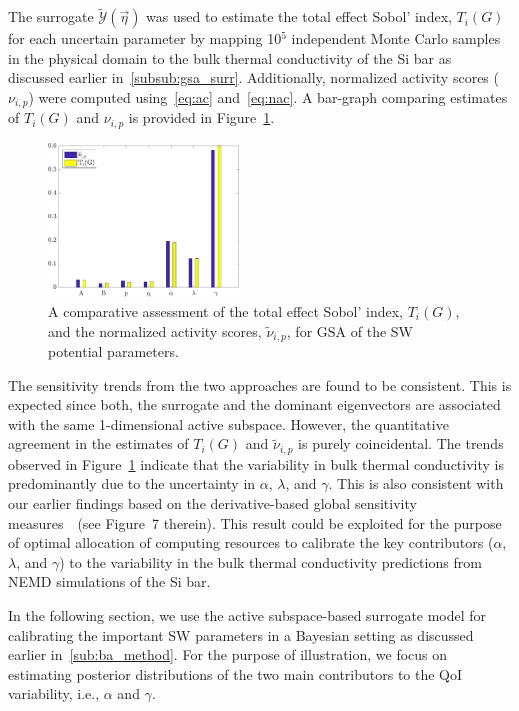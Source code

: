 The surrogate $\tilde{\mathcal{Y}}(\vec{\eta})$ was used to estimate the total effect Sobol'
 index, $T_i(G)$ for each
uncertain parameter by mapping 10$^5$ independent Monte Carlo samples in the physical domain
to the bulk thermal conductivity of the Si bar as discussed earlier in~\ref{subsub:gsa_surr}. 
Additionally, normalized activity scores ($\nu_{i,p}$) were computed using~\eqref{eq:ac} and~\eqref{eq:nac}.
A bar-graph comparing estimates of $T_i(G)$ and $\nu_{i,p}$ is provided in
Figure~\ref{fig:gsa}. 
%
\begin{figure}[htbp]
\begin{center}
\includegraphics[width=0.45\textwidth]{./Figures/free_as_gsa}
\caption{A comparative assessment of the total effect Sobol' index, $T_i(G)$, and the normalized
activity scores, $\tilde{\nu}_{i,p}$, for GSA of the SW potential parameters.}
\label{fig:gsa}
\end{center}
\end{figure}
%
The sensitivity trends from the two approaches are found to be consistent. This is expected since
both, the surrogate and the dominant eigenvectors are associated with the same 1-dimensional active 
subspace. However, the quantitative agreement in the estimates of $T_i(G)$ and $\tilde{\nu}_{i,p}$
is purely coincidental. The trends observed in Figure~\ref{fig:gsa} indicate
 that the variability in bulk thermal conductivity is predominantly
due to the uncertainty in $\alpha$, $\lambda$, and $\gamma$. This is also consistent with our earlier
findings based on the derivative-based global sensitivity measures~\cite{Vohra:2018a}~(see Figure~7 therein). 
This result could be exploited for the purpose of optimal allocation of computing resources to calibrate
the key contributors ($\alpha$, $\lambda$, and $\gamma$) to the variability in the bulk thermal conductivity
predictions from NEMD simulations of the Si bar. 

In the following section, we use the active subspace-based surrogate model
for calibrating the important SW parameters in a Bayesian
setting as discussed earlier in~\ref{sub:ba_method}.
 For the purpose of illustration, we focus on estimating posterior distributions of
 the two main contributors to the QoI variability, i.e.,
$\alpha$ and $\gamma$. 

